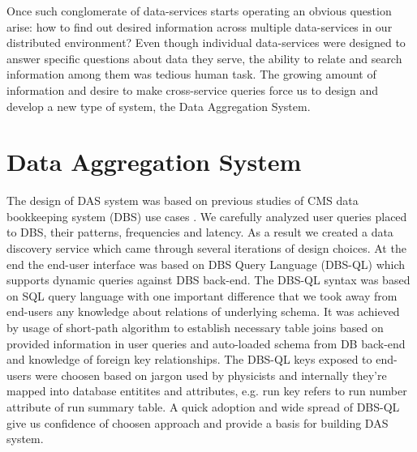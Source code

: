\documentclass[a4paper]{jpconf}
\begin{document}
Once such conglomerate of data-services starts operating an obvious
question arise: how to find out desired information across multiple data-services
in our distributed environment? Even though individual data-services were designed
to answer specific questions about data they serve, the ability to relate and search
information among them was tedious human task. The growing amount of information
and desire to make cross-service queries force us to design and develop a new
type of system, the Data Aggregation System.

\section{Data Aggregation System\label{DAS}}
The design of DAS system was based on previous studies of CMS 
data bookkeeping system (DBS) use cases \cite{DBS, DBS07}. We carefully analyzed user
queries placed to DBS, their patterns, frequencies and latency. As a result
we created a data discovery service \cite{DD} which came through several iterations
of design choices. At the end the end-user interface was based on DBS 
Query Language (DBS-QL)\cite{DBS-QL} which supports dynamic queries against
DBS back-end.
The DBS-QL \cite{DBS-QL} syntax was based on SQL query language with one important
difference that we took away from end-users any knowledge about relations of underlying schema.
It was achieved by usage of short-path algorithm to establish necessary
table joins based on provided information in user queries and auto-loaded
schema from DB back-end and knowledge of foreign key relationships.
The DBS-QL keys exposed to end-users were choosen based on jargon used by
physicists and internally they're mapped 
into database entitites and attributes, e.g. run key refers to
run number attribute of run summary table.
A quick adoption and wide spread of DBS-QL give us confidence of choosen approach 
and provide a basis for building DAS system.
\end{document}

